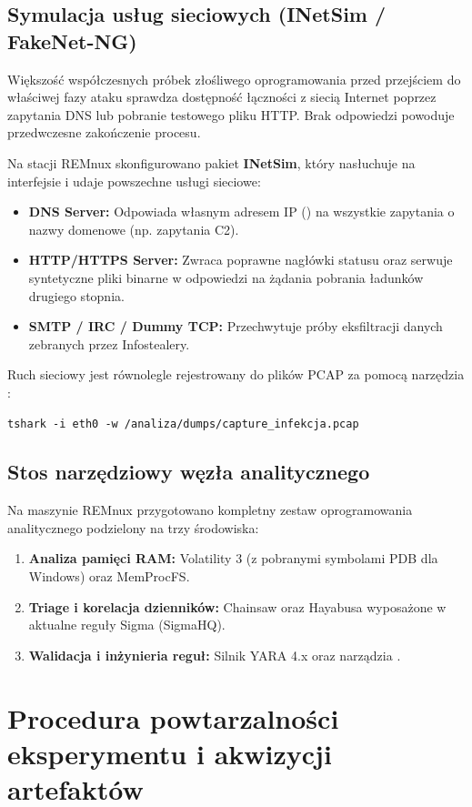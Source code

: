 \subsection{Symulacja usług sieciowych (INetSim / FakeNet-NG)}
Większość współczesnych próbek złośliwego oprogramowania przed przejściem do właściwej fazy ataku sprawdza dostępność łączności z siecią Internet poprzez zapytania DNS lub pobranie testowego pliku HTTP. Brak odpowiedzi powoduje przedwczesne zakończenie procesu.

Na stacji REMnux skonfigurowano pakiet \textbf{INetSim}, który nasłuchuje na interfejsie  i udaje powszechne usługi sieciowe:
\begin{itemize}
\item \textbf{DNS Server:} Odpowiada własnym adresem IP () na wszystkie zapytania o nazwy domenowe (np. zapytania C2).
\item \textbf{HTTP/HTTPS Server:} Zwraca poprawne nagłówki statusu  oraz serwuje syntetyczne pliki binarne w odpowiedzi na żądania pobrania ładunków drugiego stopnia.
\item \textbf{SMTP / IRC / Dummy TCP:} Przechwytuje próby eksfiltracji danych zebranych przez Infostealery.
\end{itemize}

Ruch sieciowy jest równolegle rejestrowany do plików PCAP za pomocą narzędzia :
\begin{verbatim}
tshark -i eth0 -w /analiza/dumps/capture_infekcja.pcap
\end{verbatim}

\subsection{Stos narzędziowy węzła analitycznego}
Na maszynie REMnux przygotowano kompletny zestaw oprogramowania analitycznego podzielony na trzy środowiska:
\begin{enumerate}
\item \textbf{Analiza pamięci RAM:} Volatility 3 (z pobranymi symbolami PDB dla Windows) oraz MemProcFS.
\item \textbf{Triage i korelacja dzienników:} Chainsaw oraz Hayabusa wyposażone w aktualne reguły Sigma (SigmaHQ).
\item \textbf{Walidacja i inżynieria reguł:} Silnik YARA 4.x oraz narządzia .
\end{enumerate}

\section{Procedura powtarzalności eksperymentu i akwizycji artefaktów}\label{sec:procedura_akwizycji}

